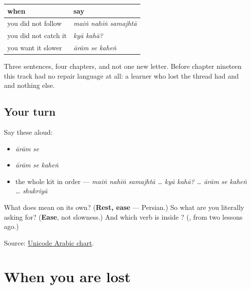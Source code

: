 \begin{grammarlens}[title={Grammar Lens: the repair kit is now whole}]
\noindent
\begin{tabularx}{\linewidth}{@{}>{\raggedright\arraybackslash}X>{\raggedright\arraybackslash}X@{}}
\toprule
\textbf{when} & \textbf{say} \\
\midrule
you did not follow & \emph{maiṅ nahīṅ samajhtā} \\
you did not catch it & \emph{kyā kahā?} \\
you want it slower & \emph{ārām se kaheṅ} \\
\bottomrule
\end{tabularx}

Three sentences, four chapters, and not one new letter. Before chapter nineteen this track had no repair language at all: a learner who lost the thread had \textbf{} and \textbf{} and nothing else.
\end{grammarlens}

\subsection*{Your turn}
Say these aloud:

\begin{itemize}
\raggedright
  \item \emph{ārām se}
  \item \emph{ārām se kaheṅ}
  \item the whole kit in order — \emph{maiṅ nahīṅ samajhtā … kyā kahā? … ārām se kaheṅ … shukriyā}
\end{itemize}

\begin{tcolorbox}[breakable,colback=teal!4,colframe=teal!35!black,title={Before you move on}]
What does \textbf{} mean on its own? (\textbf{Rest, ease} — Persian.) So what are you literally asking for? (\textbf{Ease}, not slowness.) And which verb is inside \textbf{}? (\textbf{}, from two lessons ago.)

Source: \href{https://www.unicode.org/charts/PDF/U0600.pdf}{Unicode Arabic chart}.
\end{tcolorbox}
\section[\texorpdfstring{\ur{کہنا} · \ur{کیا} \ur{کہا؟} … (kahnā · kyā …)}{کہنا · کیا کہا؟ … (kahnā · kyā …)}]{When you are lost}

\label{lesson:UR-R22-when-you-are-lost}



